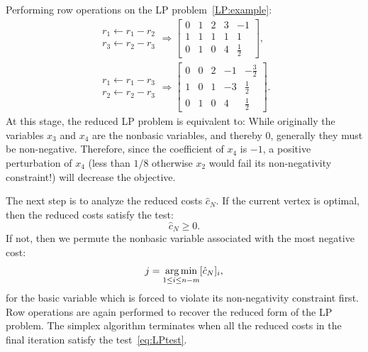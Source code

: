 \begin{example}
Performing row operations on the LP problem~\eqref{LP:example}:
\begin{align*}
\begin{array}{c} r_1\leftarrow r_1-r_2\\r_3\leftarrow r_2-r_3\end{array} \Rightarrow \left[\begin{array}{cccc|c} 0 & 1 & 2 & 3 & -1\\\hline 1 & 1 & 1 & 1 & 1\\ 0 & 1 & 0 & 4 & \tfrac{1}{2}\end{array}\right],\\
\begin{array}{c} r_1\leftarrow r_1-r_3\\r_2\leftarrow r_2-r_3\end{array} \Rightarrow \left[\begin{array}{cccc|c} 0 & 0 & 2 & -1 & -\tfrac{3}{2}\\\hline 1 & 0 & 1 & -3 & \tfrac{1}{2}\\ 0 & 1 & 0 & 4 & \tfrac{1}{2}\end{array}\right].
\end{align*}
At this stage, the reduced LP problem is equivalent to:
While originally the variables $x_3$ and $x_4$ are the nonbasic variables, and thereby $0$, generally they must be non-negative. Therefore, since the coefficient of $x_4$ is $-1$, a positive perturbation of $x_4$ (less than $1/8$ otherwise $x_2$ would fail its non-negativity constraint!) will decrease the objective.
\end{example}
The next step is to analyze the reduced costs $\hat{c}_N$. If the current vertex is optimal, then the reduced costs satisfy the test:
\begin{equation}\label{eq:LPtest}
\hat{c}_N \ge 0.
\end{equation}
If not, then we permute the nonbasic variable associated with the most negative cost:
\[
j = \argmin_{1\le i \le n-m} [\hat{c}_N]_i,
\]
for the basic variable which is forced to violate its non-negativity constraint first. Row operations are again performed to recover the reduced form of the LP problem. The simplex algorithm terminates when all the reduced costs in the final iteration satisfy the test~\eqref{eq:LPtest}.
